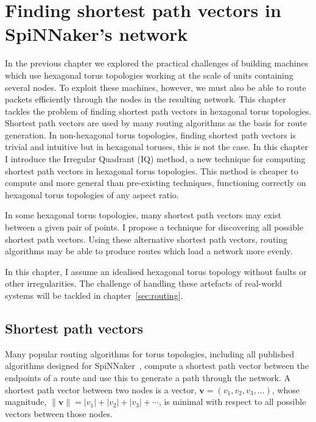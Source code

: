 \chapter{Finding shortest path vectors in SpiNNaker's network}
	
	\label{sec:shortestPaths}
	
	
	In the previous chapter we explored the practical challenges of building
	machines which use hexagonal torus topologies working at the scale of units
	containing several nodes. To exploit these machines, however, we must also be
	able to route packets efficiently through the nodes in the resulting network.
	This chapter tackles the problem of finding shortest path vectors in
	hexagonal torus topologies. Shortest path vectors are used by many routing
	algorithms as the basis for route generation. In non-hexagonal torus
	topologies, finding shortest path vectors is trivial and intuitive but in
	hexagonal toruses, this is not the case.  In this chapter I introduce the
	Irregular Quadrant (IQ) method, a new technique for computing shortest path
	vectors in hexagonal torus topologies.  This method is cheaper to compute and
	more general than pre-existing techniques, functioning correctly on hexagonal
	torus topologies of any aspect ratio.
	
	In some hexagonal torus topologies, many shortest path vectors may exist
	between a given pair of points. I propose a technique for discovering all
	possible shortest path vectors. Using these alternative shortest path
	vectors, routing algorithms may be able to produce routes which load a
	network more evenly.
	
	In this chapter, I assume an idealised hexagonal torus topology without
	faults or other irregularities. The challenge of handling these artefacts of
	real-world systems will be tackled in chapter~\ref{sec:routing}.
	
	\section{Shortest path vectors}
		
		Many popular routing algorithms for torus topologies, including all
		published algorithms designed for SpiNNaker~\cite{davies12,navaridas14},
		compute a shortest path vector between the endpoints of a route and use
		this to generate a path through the network. A shortest path vector between
		two nodes is a vector, $\mathbf{v} = (v_1, v_2, v_3, \ldots)$, whose
		magnitude, $\| \mathbf{v} \| = \lvert v_1 \rvert + \lvert v_2 \rvert +
		\lvert v_3 \rvert + \cdots$, is minimal with respect to all possible
		vectors between those nodes.
		

